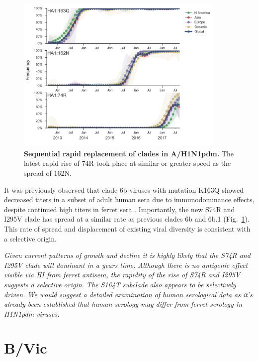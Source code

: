 \documentclass[11pt,oneside,letterpaper]{article}
\newcommand{\FIG}[1]{Fig.~\ref{#1}}
\begin{document}
\begin{figure}[H]
  \centering
  \includegraphics[width=0.9\textwidth]{../figures/sep-2017/h1n1pdm_mutations_6b_6b1.png}
  \caption{\textbf{Sequential rapid replacement of clades in A/H1N1pdm.} The latest rapid rise of 74R took place at similar or greater speed as the spread of 162N.
  }
  \label{h1n1pdm_mutations_6b_6b1}
\end{figure}
It was previously observed that clade 6b viruses with mutation K163Q
showed decreased titers in a subset of adult human sera due to
immunodominance effects, despite continued high titers in ferret sera
\cite{linderman2014potential}.
Importantly, the new S74R and I295V clade has spread at a similar
rate as previous clades 6b and 6b.1 (\FIG{h1n1pdm_mutations_6b_6b1}). This rate of spread and
displacement of existing viral diversity is consistent with a selective
origin.

\emph{Given current patterns of growth and decline it is highly likely
that the S74R and I295V clade will dominant in a years time. Although
there is no antigenic effect visible via HI from ferret antisera, the
rapidity of the rise of S74R and I295V suggests a selective origin. The S164T subclade also appears to be selectively driven. We
would suggest a detailed examination of human serological data as it's
already been established that human serology may differ from ferret
serology in H1N1pdm viruses.}

\clearpage
\section*{B/Vic}
\end{document}

